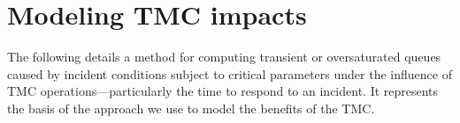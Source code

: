 \documentclass[12pt]{report}
\DeclareMathOperator{\poisson}{P} %
\DeclareMathOperator{\nbin}{NBin} %
\newcounter{time}
\begin{document}






\section{Modeling {TMC} impacts}
\label{sec:mod-tmc-impacts}

The following details a method for computing transient or
oversaturated queues caused by incident conditions subject to critical
parameters under the influence of \ac{TMC} operations---particularly
the time to respond to an incident. It represents the basis of the
approach we use to model the benefits of the \ac{TMC}.
\end{document}
